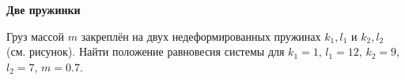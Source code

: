 \documentclass[11pt,a4paper]{article}
\begin{document}
\newpage
\textbf{Две пружинки}

Груз массой $m$ закреплён на двух недеформированных пружинах $k_1, l_1$ и $k_2, l_2$ (см. рисунок).
Найти положение равновесия системы для $k_1=1$, $l_1=12$, $k_2=9$, $l_2=7$, $m=0.7$.

\begin{center}
\end{center}
    
    
    
\end{document}
